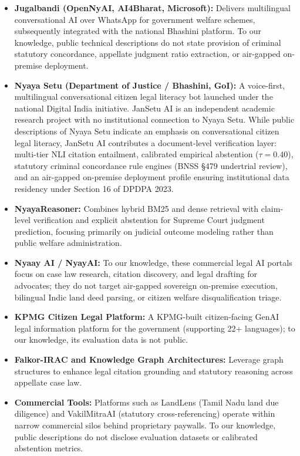 \documentclass[12pt,a4paper,oneside]{report}
\begin{document}
\begin{itemize}[itemsep=2pt]
    \item \textbf{Jugalbandi (OpenNyAI, AI4Bharat, Microsoft):} Delivers multilingual conversational AI over WhatsApp for government welfare schemes, subsequently integrated with the national Bhashini platform. To our knowledge, public technical descriptions do not state provision of criminal statutory concordance, appellate judgment ratio extraction, or air-gapped on-premise deployment.
    \item \textbf{Nyaya Setu (Department of Justice / Bhashini, GoI):} A voice-first, multilingual conversational citizen legal literacy bot launched under the national Digital India initiative. JanSetu AI is an independent academic research project with no institutional connection to Nyaya Setu. While public descriptions of Nyaya Setu indicate an emphasis on conversational citizen legal literacy, JanSetu AI contributes a document-level verification layer: multi-tier NLI citation entailment, calibrated empirical abstention ($\tau = 0.40$), statutory criminal concordance rule engines (BNSS \S 479 undertrial review), and an air-gapped on-premise deployment profile ensuring institutional data residency under Section 16 of DPDPA 2023.
    \item \textbf{NyayaReasoner:} Combines hybrid BM25 and dense retrieval with claim-level verification and explicit abstention for Supreme Court judgment prediction, focusing primarily on judicial outcome modeling rather than public welfare administration.
    \item \textbf{Nyaay AI / NyayAI:} To our knowledge, these commercial legal AI portals focus on case law research, citation discovery, and legal drafting for advocates; they do not target air-gapped sovereign on-premise execution, bilingual Indic land deed parsing, or citizen welfare disqualification triage.
    \item \textbf{KPMG Citizen Legal Platform:} A KPMG-built citizen-facing GenAI legal information platform for the government (supporting 22+ languages); to our knowledge, its evaluation data is not public.
    \item \textbf{Falkor-IRAC and Knowledge Graph Architectures:} Leverage graph structures to enhance legal citation grounding and statutory reasoning across appellate case law.
    \item \textbf{Commercial Tools:} Platforms such as LandLens (Tamil Nadu land due diligence) and VakilMitraAI (statutory cross-referencing) operate within narrow commercial silos behind proprietary paywalls. To our knowledge, public descriptions do not disclose evaluation datasets or calibrated abstention metrics.
\end{itemize}
\end{document}
